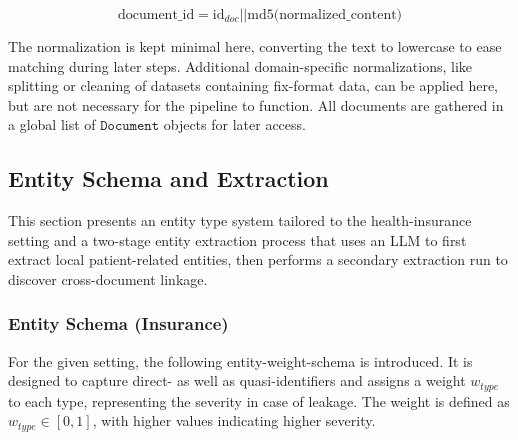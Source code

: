 \[\mbox{document\_id} = \mbox{id}_{doc} \vert\vert \mbox{md5(normalized\_content)}\]

The normalization is kept minimal here, converting the text to lowercase to ease matching during later steps. Additional domain-specific normalizations, like splitting or cleaning of datasets containing fix-format data, can be applied here, but are not necessary for the pipeline to function.
All documents are gathered in a global list of $\texttt{Document}$ objects for later access.

\subsection{Entity Schema and Extraction}
This section presents an entity type system tailored to the health-insurance setting and a two-stage entity extraction process that uses an LLM to first extract local patient-related entities, then performs a secondary extraction run to discover cross-document linkage.

\subsubsection{Entity Schema (Insurance)}\label{subsubsec:entity_schema}
For the given setting, the following entity-weight-schema is introduced. It is designed to capture direct- as well as quasi-identifiers and assigns a weight $w_{type}$ to each type, representing the severity in case of leakage. The weight is defined as $w_{type}\in[0,1]$, with higher values indicating higher severity.

